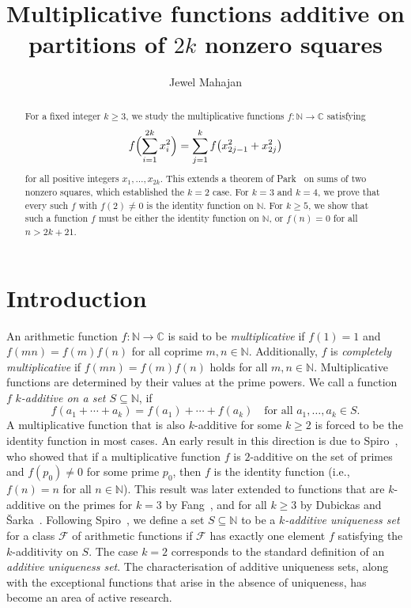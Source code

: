 \documentclass[11pt,a4paper]{amsart}
\title[\bfseries Multiplicative functions additive on partitions of $2k$ nonzero squares]{Multiplicative functions additive on partitions of $2k$ nonzero squares}
\author{Jewel Mahajan}
\newcommand{\N}{\mathbb{N}}
\newcommand{\C}{\mathbb{C}}
\theoremstyle{plain}
\theoremstyle{definition}
\begin{document}
\begin{abstract}
For a fixed integer $k \ge 3$, we study the multiplicative functions $f\colon\N\to\C$ satisfying
\[
   f\Bigl(\sum_{i=1}^{2k} x_i^2\Bigr) = \sum_{j=1}^{k} f\bigl(x_{2j-1}^2 + x_{2j}^2\bigr)
\]
for all positive integers $x_1,\dots,x_{2k}$. This extends a theorem of Park~\cite{ParkTwoSquares} on sums of two nonzero squares, which established the $k=2$ case. For $k=3$ and $k=4$, we prove that every such $f$ with $f(2)\neq 0$ is the identity function on $\N$. For $k \ge 5$, we show that such a function $f$ must be either the identity function on $\N$, or $f(n) = 0$ for all $n > 2k + 21$.
\end{abstract}

\maketitle

\section{Introduction}
An arithmetic function $f\colon \mathbb{N} \to \mathbb{C}$ is said to be \emph{multiplicative} if $f(1) = 1$ and $f(mn) = f(m)f(n)$ for all coprime $m, n \in \mathbb{N}$. Additionally, $f$ is \emph{completely multiplicative} if $f(mn) = f(m)f(n)$ holds for all $m, n \in \mathbb{N}$. Multiplicative functions are determined by their values at the prime powers. We call a function $f$ \textit{$k$-additive on a set $S\subseteq \N$}, if 
\[
    f(a_1 + \cdots + a_k) = f(a_1) + \cdots + f(a_k) \quad \text{for all } a_1, \dots, a_k \in S.
\]
A multiplicative function that is also $k$-additive for some $k \ge 2$ is forced to be the identity function in most cases. An early result in this direction is due to Spiro~\cite{Spiro1992}, who showed that if a multiplicative function $f$ is $2$-additive on the set of primes and $f(p_0)\neq 0$ for some prime $p_0$, then $f$ is the identity function (i.e., $f(n)=n$ for all $n \in \N$). This result was later extended to functions that are $k$-additive on the primes for $k=3$ by Fang~\cite{Fang2011}, and for all $k \ge 3$ by Dubickas and \v{S}arka~\cite{DubickasSarka2013}.
Following Spiro~\cite{Spiro1992}, we define a set $S \subseteq \mathbb{N}$ to be a \emph{$k$-additive uniqueness set} for a class $\mathcal{F}$ of arithmetic functions if $\mathcal{F}$ has exactly one element $f$ satisfying the $k$-additivity on $S$. The case $k=2$ corresponds to the standard definition of an \emph{additive uniqueness set}. The characterisation of additive uniqueness sets, along with the exceptional functions that arise in the absence of uniqueness, has become an area of active research.
\end{document}
